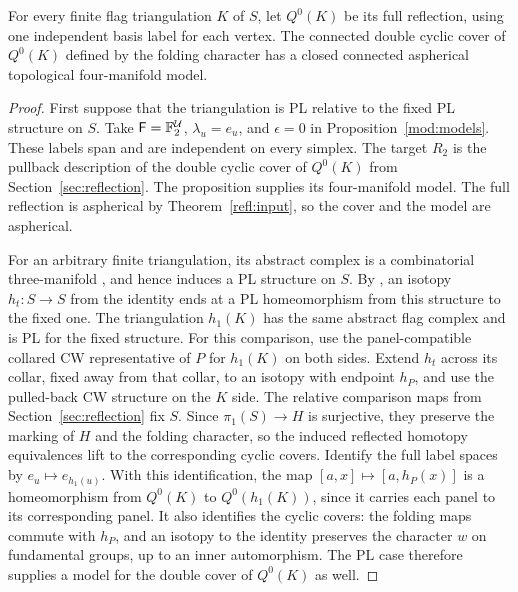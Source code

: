 \begin{corollary}
\label{refl:even-model}
For every finite flag triangulation \(K\) of \(S\), let \(Q^0(K)\)
be its full reflection, using one independent basis label for each
vertex.  The connected double cyclic cover of \(Q^0(K)\) defined by
the folding character has a closed connected aspherical topological
four-manifold model.
\end{corollary}

\begin{proof}
First suppose that the triangulation is PL relative to the fixed PL
structure on \(S\).  Take \(\mathsf F=\mathbb F_2^{\mathcal U}\), \(\lambda_u=e_u\), and
\(\epsilon=0\) in Proposition~\ref{mod:models}.  These labels span
and are independent on every simplex.  The target \(R_2\) is the
pullback description of the double cyclic cover of \(Q^0(K)\) from
Section~\ref{sec:reflection}.  The proposition supplies its
four-manifold model.  The full reflection is aspherical by
Theorem~\ref{refl:input}, so the cover and the model are aspherical.

For an arbitrary finite triangulation, its abstract complex is a
combinatorial three-manifold
\cite[Section~2.1, p.~3]{PaixaoSpreer2015}, and hence induces a PL
structure on \(S\).  By \cite[Theorem~2(2), p.~64]{Hamilton1976}, an
isotopy \(h_t:S\to S\) from the identity ends at a PL homeomorphism
from this structure to the fixed one.  The triangulation \(h_1(K)\)
has the same abstract flag complex and is PL for the fixed structure.
For this comparison, use the panel-compatible collared CW representative
of \(P\) for \(h_1(K)\) on both sides.  Extend \(h_t\) across its collar,
fixed away from that collar, to an isotopy with endpoint \(h_P\), and
use the pulled-back CW structure on the \(K\) side.  The relative
comparison maps from Section~\ref{sec:reflection} fix \(S\).  Since
\(\pi_1(S)\to H\) is surjective, they preserve the marking of \(H\)
and the folding character, so the induced reflected homotopy equivalences
lift to the corresponding cyclic covers.  Identify the full label spaces
by \(e_u\mapsto e_{h_1(u)}\).  With this identification, the map
\([a,x]\mapsto[a,h_P(x)]\) is a homeomorphism from \(Q^0(K)\) to
\(Q^0(h_1(K))\), since it carries each panel to its corresponding
panel.  It also identifies the cyclic covers: the folding maps commute
with \(h_P\), and an isotopy to the identity preserves the character
\(w\) on fundamental groups, up to an inner automorphism.  The PL case
therefore supplies a model for the double cover of \(Q^0(K)\) as well.
\end{proof}

